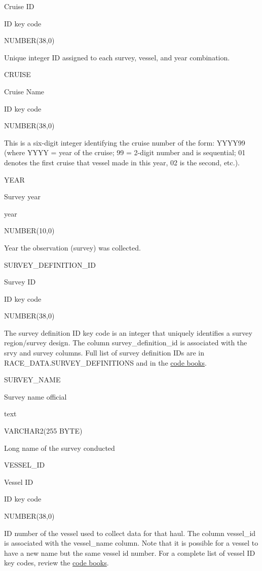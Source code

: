 \documentclass[
  letterpaper,
  oneside,
  open=any]{scrbook}
\begin{document}
Cruise ID

ID key code

NUMBER(38,0)

Unique integer ID assigned to each survey, vessel, and year combination.

CRUISE

Cruise Name

ID key code

NUMBER(38,0)

This is a six-digit integer identifying the cruise number of the form:
YYYY99 (where YYYY = year of the cruise; 99 = 2-digit number and is
sequential; 01 denotes the first cruise that vessel made in this year,
02 is the second, etc.).

YEAR

Survey year

year

NUMBER(10,0)

Year the observation (survey) was collected.

SURVEY\_DEFINITION\_ID

Survey ID

ID key code

NUMBER(38,0)

The survey definition ID key code is an integer that uniquely identifies
a survey region/survey design. The column survey\_definition\_id is
associated with the srvy and survey columns. Full list of survey
definition IDs are in RACE\_DATA.SURVEY\_DEFINITIONS and in the
\href{https://www.fisheries.noaa.gov/resource/document/groundfish-survey-species-code-manual-and-data-codes-manual}{code
books}.

SURVEY\_NAME

Survey name official

text

VARCHAR2(255 BYTE)

Long name of the survey conducted

VESSEL\_ID

Vessel ID

ID key code

NUMBER(38,0)

ID number of the vessel used to collect data for that haul. The column
vessel\_id is associated with the vessel\_name column. Note that it is
possible for a vessel to have a new name but the same vessel id number.
For a complete list of vessel ID key codes, review the
\href{https://www.fisheries.noaa.gov/resource/document/groundfish-survey-species-code-manual-and-data-codes-manual}{code
books}.
\end{document}
